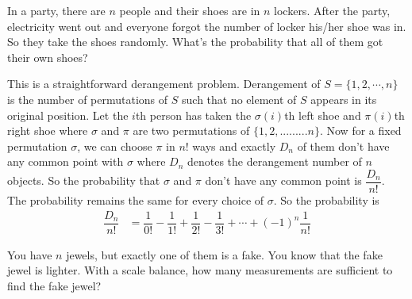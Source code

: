 \documentclass{subfile}
\begin{document}
		
		\begin{problem}
			In a party, there are $n$ people and their shoes are in $n$ lockers. After the party, electricity went out and everyone forgot the number of locker his/her shoe was in. So they take the shoes randomly. What's the probability that all of them got their own shoes?
		\end{problem}
		
		\begin{solution}
		    This is a straightforward derangement problem. Derangement of $S=\{1,2,\cdots,n\}$ is the number of permutations of $S$ such that no element of $S$ appears in its original position. Let the $i$th person has taken the $\sigma(i)$th left shoe and $\pi(i)$th right shoe where $\sigma$ and $\pi$ are two permutations of $\{1,2,.........n\}$. Now for a fixed permutation $\sigma$, we can choose $\pi$ in $n!$ ways and exactly $D_n$ of them don't have any common point with $\sigma$ where $D_n$ denotes the derangement number of $n$ objects. So the probability that $\sigma$ and $\pi$ don't have any common point is $\dfrac{D_n}{n!}$. The probability remains the same for every choice of $\sigma$. So the probability is
	            \begin{align*}
	            	\dfrac{D_n}{n!} &= \dfrac{1}{0!}-\dfrac{1}{1!} + \dfrac{1}{2!}- \dfrac{1}{3!} + \cdots + (-1)^n \dfrac{1}{n!}
	            \end{align*}
		\end{solution}
		
		\begin{problem}
			You have $n$ jewels, but exactly one of them is a fake. You know that the fake jewel is lighter. With a scale balance, how many measurements are sufficient to find the fake jewel?
		\end{problem}
		
\end{document}
